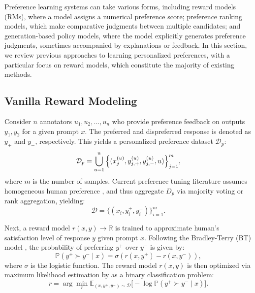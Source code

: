 Preference learning systems can take various forms, including reward models (RMs), where a model assigns a numerical preference score; preference ranking models, which make comparative judgments between multiple candidates; and generation-based policy models, where the model explicitly generates preference judgments, sometimes accompanied by explanations or feedback.
In this section, we review previous approaches to learning personalized preferences, with a particular focus on reward models, which constitute the majority of existing methods.

\subsection{Vanilla Reward Modeling}


Consider $n$ annotators $u_1, u_2, ..., u_n$ who provide preference feedback on outputs \(y_1, y_2\) for a given prompt $x$. The preferred and dispreferred response is denoted as \(y_+\) and \(y_-\), respectively. This yields a personalized preference dataset $\mathcal{D}_p$:
\vspace{-0.2cm}
\begin{equation*}
\mathcal{D}_p = \bigcup_{u=1}^n \Big\{ (x_j^{(u)}, y_{j,+}^{(u)}, y_{j,-}^{(u)}, u) \Big\}_{j=1}^{m},
\vspace{-0.2cm}
\end{equation*}
where \( m \) is the number of samples. Current preference tuning literature assumes homogeneous human preference \cite{NEURIPS2022_b1efde53,stiennon_learning_2022, liu2024aligning}, and thus aggregate $D_p$ via majority voting or rank aggregation, yielding:
\vspace{-0.1cm}
\begin{equation*}
\mathcal{D} = \{(x_i, y_i^+, y_i^-)\}_{i=1}^m.
\end{equation*}

\vspace{-0.1cm}
Next, a reward model $r(x, y) \to \mathbb{R}
$ is trained to approximate human's satisfaction level of response $y$ given prompt $x$. Following the Bradley-Terry (BT) model \cite{bradley1952rank}, the probability of preferring \(y^+\) over \(y^-\) is given by:
\vspace{-0.1cm}
\begin{equation*}
\mathbb{P}(y^+ \succ y^- \mid x) = \sigma(r(x, y^+) - r(x, y^-)),
\end{equation*}
where \(\sigma\) is the logistic function. The reward model \(r(x, y)\) is then optimized via maximum likelihood estimation by as a binary classification problem:
\vspace{-0.2cm}
\begin{equation}
r = \arg\min_{r} 
\mathbb{E}_{(x, y^+, y^-) \sim \mathcal{D}} 
\Big[-\log \mathbb{P}(y^+ \succ y^- \mid x) \Big].
\label{equation: rm} \nonumber
\end{equation}

